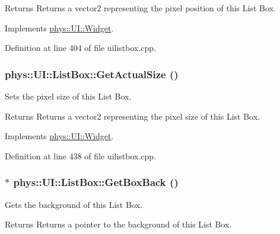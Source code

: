 \begin{DoxyReturn}{Returns}
Returns a vector2 representing the pixel position of this List Box. 
\end{DoxyReturn}


Implements \hyperlink{classphys_1_1UI_1_1Widget_a0a29fecff7f56d7909f65fd63b0990e7}{phys::UI::Widget}.



Definition at line 404 of file uilistbox.cpp.

\hypertarget{classphys_1_1UI_1_1ListBox_a23133ed4a98994d838acee4c6a981e04}{
\subsubsection[{GetActualSize}]{ phys::UI::ListBox::GetActualSize ()}}
\label{d0/d28/classphys_1_1UI_1_1ListBox_a23133ed4a98994d838acee4c6a981e04}


Sets the pixel size of this List Box. 

\begin{DoxyReturn}{Returns}
Returns a vector2 representing the pixel size of this List Box. 
\end{DoxyReturn}


Implements \hyperlink{classphys_1_1UI_1_1Widget_af3a685621ed220748c0940ea38c96ed2}{phys::UI::Widget}.



Definition at line 438 of file uilistbox.cpp.

\hypertarget{classphys_1_1UI_1_1ListBox_a087fba492ebd70a58d2772fccbfec466}{
\subsubsection[{GetBoxBack}]{ $\ast$ phys::UI::ListBox::GetBoxBack ()}}
\label{d0/d28/classphys_1_1UI_1_1ListBox_a087fba492ebd70a58d2772fccbfec466}


Gets the background of this List Box. 

\begin{DoxyReturn}{Returns}
Returns a pointer to the background of this List Box. 
\end{DoxyReturn}


